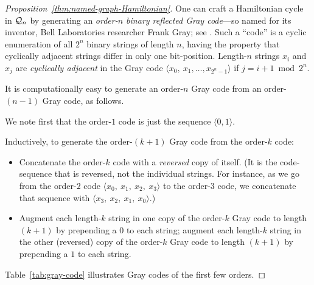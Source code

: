 \begin{proof}[Proposition~\ref{thm:named-graph-Hamiltonian}]
\smallskip

  

One can craft a Hamiltonian cycle in $\mbox{$\cal Q$}_n$ by generating an {\it order-$n$ binary reflected Gray code}---so named for its inventor, Bell Laboratories researcher Frank Gray; see \cite{PetersonW81}.   Such a ``code'' is a cyclic enumeration of all $2^n$ binary strings of length $n$, having the property that cyclically adjacent strings differ in only one bit-position.  Length-$n$ 
strings $x_i$ and $x_j$ are {\it cyclically adjacent} in the Gray code $\langle x_0, \ x_1, \ldots, x_{2^n-1} \rangle$ if $j = i+1 \bmod 2^n$.

\smallskip

\noindent
It is computationally easy to generate an order-$n$ Gray code from an order-$(n-1)$ Gray code, as follows.

\smallskip

We note first that the order-$1$ code is just the sequence $\langle 0, 1 \rangle$.

\smallskip

Inductively, to generate the order-$(k+1)$ Gray code from the order-$k$ code:
\begin{itemize}
\item
Concatenate the order-$k$ code with a {\em reversed} copy of itself.  (It is the code-sequence that is reversed, not the individual strings.  For instance, as we go from the order-$2$ code $\langle x_0, \ x_1, \ x_2, \ x_3 \rangle$ to the order-$3$ code, we concatenate that sequence with $\langle x_3, \ x_2, \ x_1, \ x_0 \rangle$.)

\medskip\item
Augment each length-$k$ string in one copy of the order-$k$ Gray code to length $(k+1)$ by prepending a $0$ to each string; augment each length-$k$ string in the other (reversed) copy of the order-$k$ Gray code to length $(k+1)$ by prepending a $1$ to each string.
\end{itemize}
Table~\ref{tab:gray-code} illustrates Gray codes of the first few orders.


\end{proof}
